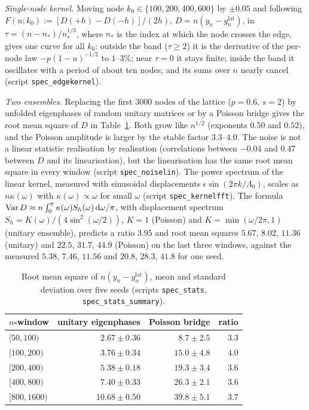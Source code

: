 \emph{Single-node kernel.} Moving node $k_0\in\{100,200,400,600\}$ by $\pm0.05$ and following
$F(n;k_0):=[D(+h)-D(-h)]/(2h)$, $D=n(y_n-y_n^{\mathrm{lat}})$, in $\tau=(n-n_*)/n_*^{1/3}$, where $n_*$ is the index at which
the node crosses the edge, gives one curve for all $k_0$: outside the band ($\tau\ge2$) it is the derivative of the per-node
law $-p(1-u)^{-1/2}$ to $1$--$3\%$; near $\tau=0$ it stays finite; inside the band it oscillates with a period of about ten
nodes, and its sums over $n$ nearly cancel (script \texttt{spec\_edgekernel}).

\emph{Two ensembles.} Replacing the first $3000$ nodes of the lattice ($p=0.6$, $s=2$) by unfolded eigenphases of random
unitary matrices or by a Poisson bridge gives the root mean square of $D$ in Table~\ref{tab:noise}. Both grow like $n^{1/2}$
(exponents $0.50$ and $0.52$), and the Poisson amplitude is larger by the stable factor $3.3$--$4.0$. The noise is not a
linear statistic realisation by realisation (correlations between $-0.04$ and $0.47$ between $D$ and its linearisation), but the
linearisation has the same root mean square in every window (script \texttt{spec\_noiselin}). The power spectrum of the
linear kernel, measured with sinusoidal displacements $\epsilon\sin(2\pi k/\Lambda_0)$, scales as $n\kappa(\omega)$ with
$\kappa(\omega)\propto\omega$ for small $\omega$ (script \texttt{spec\_kernelfft}). The formula
$\operatorname{Var} D\approx n\int_0^\pi\kappa(\omega)S_h(\omega)\,\mathrm{d}\omega/\pi$, with displacement spectrum
$S_h=K(\omega)/(4\sin^2(\omega/2))$, $K=1$ (Poisson) and $K=\min(\omega/2\pi,1)$ (unitary ensemble), predicts a ratio $3.95$ and
root mean squares $5.67$, $8.02$, $11.36$ (unitary) and $22.5$, $31.7$, $44.9$ (Poisson) on the last three windows, against the
measured $5.38$, $7.46$, $11.56$ and $20.8$, $28.3$, $41.8$ for one seed.

\begin{table}[ht]
\centering
\small
\begin{tabular}{lrrr}
\toprule
$n$-window & unitary eigenphases & Poisson bridge & ratio\\
\midrule
$[50,100)$ & $2.67\pm0.36$ & $8.7\pm2.5$ & $3.3$\\
$[100,200)$ & $3.76\pm0.34$ & $15.0\pm4.8$ & $4.0$\\
$[200,400)$ & $5.38\pm0.18$ & $19.3\pm3.4$ & $3.6$\\
$[400,800)$ & $7.40\pm0.33$ & $26.3\pm2.1$ & $3.6$\\
$[800,1600)$ & $10.68\pm0.50$ & $39.8\pm5.1$ & $3.7$\\
\bottomrule
\end{tabular}
\caption{Root mean square of $n(y_n-y_n^{\mathrm{lat}})$, mean and standard deviation over five seeds (scripts
\texttt{spec\_stats}, \texttt{spec\_stats\_summary}).}
\label{tab:noise}
\end{table}
